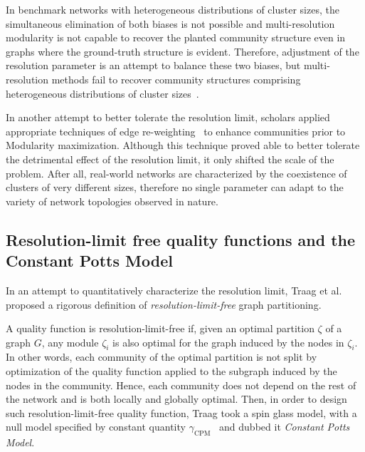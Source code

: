 In benchmark networks with heterogeneous distributions of cluster sizes, the simultaneous elimination of both biases is not possible and multi-resolution modularity is not capable to recover the planted community structure even in graphs where the ground-truth structure is evident.
Therefore, adjustment of the resolution parameter is an attempt to balance these two biases, but multi-resolution methods fail to recover community structures comprising heterogeneous distributions of cluster sizes~\cite{lancichinetti2011}. 

In another attempt to better tolerate the resolution limit, scholars applied appropriate techniques of edge re-weighting~\cite{berry2011} to enhance communities prior to Modularity maximization.
Although this technique proved able to better tolerate the detrimental effect of the resolution limit, it only shifted the scale of the problem.
After all, real-world networks are characterized by the coexistence of clusters of very different sizes, therefore no single parameter can adapt to the variety of network topologies observed in nature.

\subsection{Resolution-limit free quality functions and the Constant Potts Model}
In an attempt to quantitatively characterize the resolution limit, Traag et al.~\cite{traag2011} proposed a rigorous definition of \emph{resolution-limit-free} graph partitioning.

A quality function is resolution-limit-free if, given an optimal partition $\zeta$ of a graph $G$, any module $\zeta_i$ is also optimal for the graph induced by the nodes in $\zeta_i$.
In other words, each community of the optimal partition is not split by optimization of the quality function applied to the subgraph induced by the nodes in the community.
Hence, each community does not depend on the rest of the network and is both locally and globally optimal.
Then, in order to design such resolution-limit-free quality function, Traag took a spin glass model, with a null model specified by constant quantity $\gamma_{\textrm{CPM}}$~\cite{traag2011} and dubbed it \emph{Constant Potts Model}.

